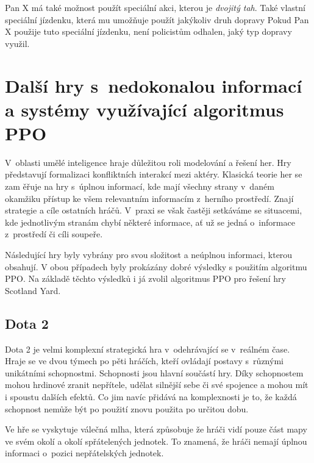 Pan X má také možnost použít speciální akci, kterou je \emph{dvojitý tah}.
Také vlastní speciální jízdenku, která mu umožňuje použít jakýkoliv druh dopravy
Pokud Pan X použije tuto speciální jízdenku, není policistům odhalen, jaký typ dopravy využil.

\section{Další hry s~nedokonalou informací a systémy využívající algoritmus PPO}\label{sec:dalsi-hry-s-nedokonalou-informaci}
V~oblasti umělé inteligence hraje důležitou roli modelování a řešení her.
Hry představují formalizaci konfliktních interakcí mezi aktéry.
Klasická teorie her se zam ěřuje na hry s~úplnou informací, kde mají všechny strany v~daném okamžiku přístup ke všem relevantním informacím z~herního prostředí.
Znají strategie a cíle ostatních hráčů.
V~praxi se však častěji setkáváme se situacemi, kde jednotlivým stranám chybí některé informace, ať už se jedná o~informace z~prostředí či cíli soupeře.

Následující hry byly vybrány pro svou složitost a neúplnou informaci, kterou obsahují.
V obou případech byly prokázány dobré výsledky s použitím algoritmu PPO.
Na základě těchto výsledků i já zvolil algoritmus PPO pro řešení hry Scotland Yard.

\subsection{Dota 2}\label{subsec:dota}
Dota 2 je velmi komplexní strategická hra v~odehrávající se v~reálném čase.
Hraje se ve dvou týmech po pěti hráčích, kteří ovládají postavy s~různými unikátními schopnostmi.
Schopnosti jsou hlavní součástí hry.
Díky schopnostem mohou hrdinové zranit nepřítele, udělat silnější sebe či své spojence a mohou mít i spoustu dalších efektů.
Co jim navíc přidává na komplexnosti je to, že každá schopnost nemůže být po použití znovu použita po určitou dobu.

Ve hře se vyskytuje válečná mlha, která způsobuje že hráči vidí pouze část mapy ve svém okolí a okolí spřátelených jednotek.
To znamená, že hráči nemají úplnou informaci o~pozici nepřátelských jednotek.

\bigskip

